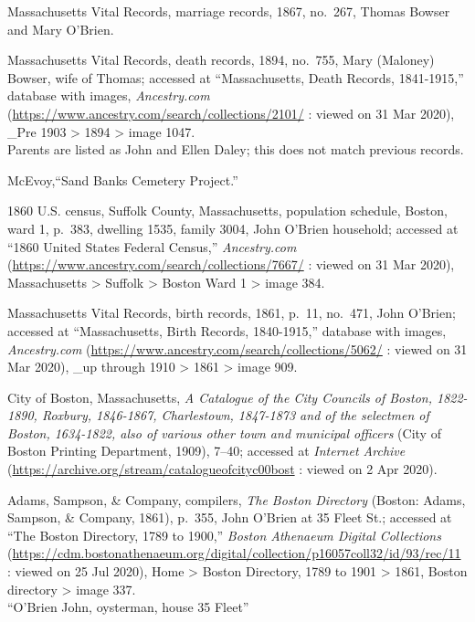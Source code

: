 \begin{thebibliography}{999}
Massachusetts Vital Records, marriage records, 1867, no.\ 267, Thomas Bowser and Mary O'Brien.

Massachusetts Vital Records, death records, 1894, no.\ 755, Mary (Maloney) Bowser, wife of Thomas; accessed at ``Massachusetts, Death Records, 1841-1915,'' database with images, \textit{Ancestry.com} (\url{https://www.ancestry.com/search/collections/2101/} : viewed on 31 Mar 2020), \_Pre 1903 > 1894 > image 1047.\\
Parents are listed as John and Ellen Daley; this does not match previous records.

McEvoy,``Sand Banks Cemetery Project.''

1860 U.S. census, Suffolk County, Massachusetts, population schedule, Boston, ward 1, p.\ 383, dwelling 1535, family 3004, John O'Brien household; accessed at ``1860 United States Federal Census,'' \textit{Ancestry.com} (\url{https://www.ancestry.com/search/collections/7667/} : viewed on 31 Mar 2020), Massachusetts > Suffolk > Boston Ward 1 > image 384.

Massachusetts Vital Records, birth records, 1861, p.\ 11, no.\ 471, John O'Brien; accessed at ``Massachusetts, Birth Records, 1840-1915,'' database with images, \textit{Ancestry.com} (\url{https://www.ancestry.com/search/collections/5062/} : viewed on 31 Mar 2020), \_up through 1910 > 1861 > image 909.

City of Boston, Massachusetts, \textit{A Catalogue of the City Councils of Boston, 1822-1890, Roxbury, 1846-1867, Charlestown, 1847-1873 and of the selectmen of Boston, 1634-1822, also of various other town and municipal officers} (City of Boston Printing Department, 1909), 7--40; accessed at \textit{Internet Archive} (\url{https://archive.org/stream/catalogueofcityc00bost} : viewed on 2 Apr 2020).

Adams, Sampson, \& Company, compilers, \textit{The Boston Directory} (Boston: Adams, Sampson, \& Company, 1861), p.\ 355, John O'Brien at 35 Fleet St.; accessed at ``The Boston Directory, 1789 to 1900,'' \textit{Boston Athenaeum Digital Collections} (\url{https://cdm.bostonathenaeum.org/digital/collection/p16057coll32/id/93/rec/11} : viewed on 25 Jul 2020), Home > Boston Directory, 1789 to 1901 > 1861, Boston directory > image 337.\\
``O'Brien John, oysterman, house 35 Fleet''


\end{thebibliography}
